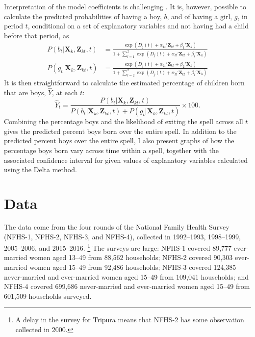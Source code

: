\documentclass[12pt,letterpaper]{article}
\begin{document}
Interpretation of the model coefficients is challenging \citep{thomas96}.
It is, however, possible to calculate the predicted probabilities of 
having a boy, $b$, and of having a girl, $g$, in period $t$, conditional on 
a set of explanatory variables and not having had a child before that period, as
\begin{align}
P(b_{t} | \mathbf{X}_{k}, \mathbf{Z}_{kt}, t ) 
& =  
\frac{ \exp(D_j(t) + \alpha_{1t}' \mathbf{Z}_{kt} + \beta_1' \mathbf{X}_{k} )}
{1 + \sum_{l=1}^2 \exp(D_j(t) + \alpha_{lt} ' \mathbf{Z}_{kt} + \beta_l ' \mathbf{X}_{k})}
\label{eq:probability_boy} \\
P(g_{t} | \mathbf{X}_{k}, \mathbf{Z}_{kt},t ) 
& =  
\frac{ \exp(D_j(t) + \alpha_{2t}'\mathbf{Z}_{kt} + \beta_2'\mathbf{X}_{k} )}
{1 + \sum_{l=2}^2 \exp(D_j(t) + \alpha_{lt}'\mathbf{Z}_{kt} + \beta_l'\mathbf{X}_{k})}
\label{eq:probability_girl}
\end{align}
It is then straightforward to calculate the estimated percentage of children born that 
are boys, $\hat{Y}$, at each $t$:  
\begin{equation}
\hat{Y}_t 
= 
\frac{ P(b_{t} | \mathbf{X}_{k}, \mathbf{Z}_{kt},t )}
{ P(b_{t} | \mathbf{X}_{k}, \mathbf{Z}_{kt},t) + P(g_{t} | \mathbf{X}_{k}, \mathbf{Z}_{kt},t )} 
\times 100.
\label{eq:probability_son}
\end{equation}
Combining the percentage boys and the likelihood of exiting the spell 
across all $t$ gives the predicted percent boys born over the entire spell.
In addition to the predicted percent boys over the entire spell, 
I also present graphs of how the percentage boys born vary across time
within a spell, together with the associated confidence interval for given 
values of explanatory variables calculated using the Delta method.


\section{Data\label{sec:data}}

The data come from the four rounds of the National Family Health Survey 
(NFHS-1, NFHS-2, NFHS-3, and NFHS-4),
collected in 1992--1993, 1998--1999, 2005--2006, and 2015--2016.%
\footnote{
A delay in the survey for Tripura means that NFHS-2 has some observation 
collected in 2000.
}
The surveys are large: NFHS-1 covered 89,777 ever-married women 
aged 13--49 from 88,562 households;
NFHS-2 covered 90,303 ever-married women aged 15--49 from 92,486 households;
NFHS-3 covered 124,385 never-married and ever-married women aged 
15--49 from 109,041 households;
and 
NFHS-4 covered 699,686 never-married and ever-married women aged
15--49 from 601,509 households surveyed.
\end{document}

